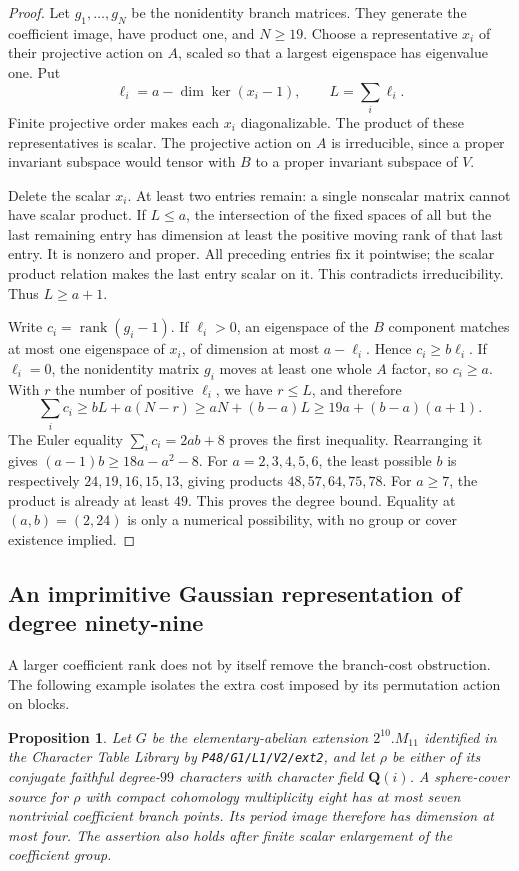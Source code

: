 \documentclass[11pt]{article}
\newtheorem{proposition}[theorem]{Proposition}
\theoremstyle{definition}
\theoremstyle{remark}
\newcommand{\Q}{\mathbf Q}
\begin{document}
\begin{proof}
Let $g_1,\ldots,g_N$ be the nonidentity branch matrices.  They generate
the coefficient image, have product one, and $N\ge19$.
Choose a representative $x_i$ of their projective action on $A$,
scaled so that a largest eigenspace has eigenvalue one.  Put
\[
 \ell_i=a-\dim\ker(x_i-1),\qquad L=\sum_i\ell_i.
\]
Finite projective order makes each $x_i$ diagonalizable.  The product
of these representatives is scalar.  The projective action on $A$
is irreducible, since a proper invariant subspace would tensor with
$B$ to a proper invariant subspace of $V$.

Delete the scalar $x_i$.  At least two entries remain: a single
nonscalar matrix cannot have scalar product.  If $L\le a$, the
intersection of the fixed spaces of all but the last remaining
entry has dimension at least the positive moving rank of that last
entry.  It is nonzero and proper.  All preceding entries fix it
pointwise; the scalar product relation makes the last entry scalar
on it.  This contradicts irreducibility.  Thus $L\ge a+1$.

Write $c_i=\operatorname{rank}(g_i-1)$.  If $\ell_i>0$, an eigenspace
of the $B$ component matches at most one eigenspace of $x_i$, of
dimension at most $a-\ell_i$.  Hence $c_i\ge b\ell_i$.
If $\ell_i=0$, the nonidentity matrix $g_i$ moves at least one whole
$A$ factor, so $c_i\ge a$.  With $r$ the number of positive $\ell_i$,
we have $r\le L$, and therefore
\[
 \sum_i c_i\ge bL+a(N-r)
    \ge aN+(b-a)L
    \ge19a+(b-a)(a+1).
\]
The Euler equality $\sum_i c_i=2ab+8$ proves the first inequality.
Rearranging it gives $(a-1)b\ge18a-a^2-8$.
For $a=2,3,4,5,6$, the least possible $b$ is respectively
$24,19,16,15,13$, giving products $48,57,64,75,78$.
For $a\ge7$, the product is already at least $49$.
This proves the degree bound.  Equality at $(a,b)=(2,24)$ is only
a numerical possibility, with no group or cover existence implied.
\end{proof}

\subsection{An imprimitive Gaussian representation of degree ninety-nine}

A larger coefficient rank does not by itself remove the branch-cost
obstruction. The following example isolates the extra cost imposed by
its permutation action on blocks.

\begin{proposition}\label{prop:degree99-cover}
Let $G$ be the elementary-abelian extension $2^{10}.M_{11}$ identified
in the Character Table Library by
\texttt{P48/G1/L1/V2/ext2}, and let $\rho$ be either of its conjugate
faithful degree-$99$ characters with character field $\Q(i)$.
A sphere-cover source for $\rho$ with compact cohomology multiplicity
eight has at most seven nontrivial coefficient branch points. Its
period image therefore has dimension at most four. The assertion
also holds after finite scalar enlargement of the coefficient group.
\end{proposition}
\end{document}
